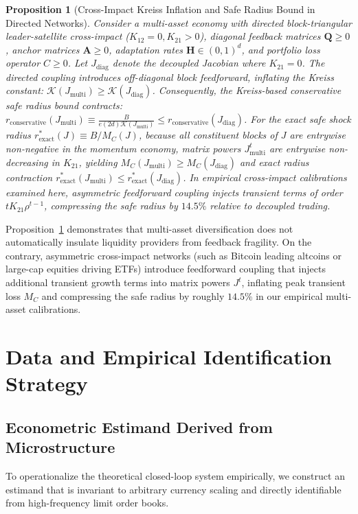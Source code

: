 \documentclass[12pt]{article}
\newtheorem{proposition}[theorem]{Proposition}
\theoremstyle{definition}
\theoremstyle{remark}
\begin{document}
\begin{proposition}[Cross-Impact Kreiss Inflation and Safe Radius Bound in Directed Networks]
\label{prop:cross_kreiss}
Consider a multi-asset economy with directed block-triangular leader-satellite cross-impact ($K_{12} = 0, K_{21} > 0$), diagonal feedback matrices $\mathbf{Q} \ge 0$, anchor matrices $\mathbf{A} \ge 0$, adaptation rates $\mathbf{H} \in (0, 1)^d$, and portfolio loss operator $C \ge 0$. Let $J_{\text{diag}}$ denote the decoupled Jacobian where $K_{21} = 0$.
The directed coupling introduces off-diagonal block feedforward, inflating the Kreiss constant: $\mathcal{K}(J_{\text{multi}}) \ge \mathcal{K}(J_{\text{diag}})$. Consequently, the Kreiss-based conservative safe radius bound contracts: $r_{\text{conservative}}(J_{\text{multi}}) \equiv \frac{B}{e (2d) \mathcal{K}(J_{\text{multi}})} \le r_{\text{conservative}}(J_{\text{diag}})$.
For the exact safe shock radius $r^*_{\text{exact}}(J) \equiv B / M_C(J)$, because all constituent blocks of $J$ are entrywise non-negative in the momentum economy, matrix powers $J_{\text{multi}}^t$ are entrywise non-decreasing in $K_{21}$, yielding $M_C(J_{\text{multi}}) \ge M_C(J_{\text{diag}})$ and exact radius contraction $r^*_{\text{exact}}(J_{\text{multi}}) \le r^*_{\text{exact}}(J_{\text{diag}})$. In empirical cross-impact calibrations examined here, asymmetric feedforward coupling injects transient terms of order $t K_{21} \rho^{t-1}$, compressing the safe radius by $14.5\%$ relative to decoupled trading.
\end{proposition}

Proposition~\ref{prop:cross_kreiss} demonstrates that multi-asset diversification does not automatically insulate liquidity providers from feedback fragility. On the contrary, asymmetric cross-impact networks (such as Bitcoin leading altcoins or large-cap equities driving ETFs) introduce feedforward coupling that injects additional transient growth terms into matrix powers $J^t$, inflating peak transient loss $M_C$ and compressing the safe radius by roughly $14.5\%$ in our empirical multi-asset calibrations.

\section{Data and Empirical Identification Strategy}
\label{sec:data_estimand}

\subsection{Econometric Estimand Derived from Microstructure}
To operationalize the theoretical closed-loop system empirically, we construct an estimand that is invariant to arbitrary currency scaling and directly identifiable from high-frequency limit order books.
\end{document}
